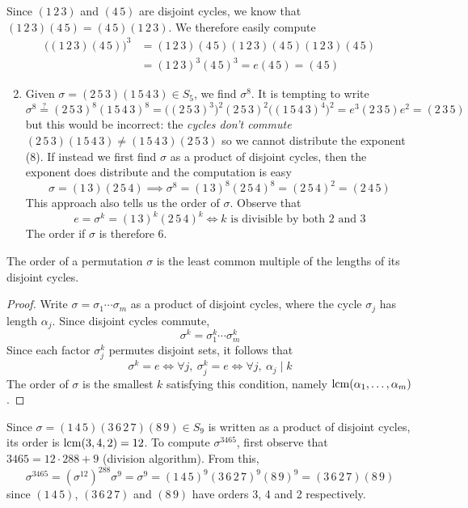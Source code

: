 \begin{examples}{}{}
	\exstart Since $(1\,2\,3)$ and $(4\,5)$ are disjoint cycles, we know that $(1\,2\,3)(4\,5)=(4\,5)(1\,2\,3)$. We therefore easily compute
		\begin{align*}
			\bigl((1\,2\,3)(4\,5)\bigr)^3&=(1\,2\,3)(4\,5)(1\,2\,3)(4\,5)(1\,2\,3)(4\,5)\\
			&=(1\,2\,3)^3(4\,5)^3 =e(4\,5)=(4\,5)
		\end{align*}
	\begin{enumerate}\setcounter{enumi}{1}
		\item Given $\sigma=(2\,5\,3)(1\,5\,4\,3)\in S_5$, we find $\sigma^{8}$. It is tempting to write
		\[
			\sigma^{8}\overset{\text{?}}{=}(2\,5\,3)^{8}(1\,5\,4\,3)^{8} =\bigl((2\,5\,3)^3\bigr)^2(2\,5\,3)^2\bigl((1\,5\,4\,3)^4\bigr)^2 =e^3(2\,3\,5)e^2  =(2\,3\,5)
		\]
		but this would be incorrect: the \emph{cycles don't commute} $(2\,5\,3)(1\,5\,4\,3)\neq (1\,5\,4\,3)(2\,5\,3)$ so we cannot distribute the exponent (8). If instead we first find $\sigma$ as a product of disjoint cycles, then the exponent does distribute and the computation is easy
		\[
			\sigma=(1\,3)(2\,5\,4)\implies \sigma^8=(1\,3)^8(2\,5\,4)^8=(2\,5\,4)^2 =(2\,4\,5)
		\]
		This approach also tells us the order of $\sigma$. Observe that
		\[
			e=\sigma^k=(1\,3)^k(2\,5\,4)^k\iff k\text{ is divisible by both 2 and 3}
		\]
		The order if $\sigma$ is therefore 6.
	\end{enumerate}
\end{examples}

\begin{cor}{}{}
	The order of a permutation $\sigma$ is the least common multiple of the lengths of its disjoint cycles.
\end{cor}

\begin{proof}
	Write $\sigma=\sigma_1\cdots\sigma_m$ as a product of disjoint cycles, where the cycle $\sigma_j$ has length $\alpha_j$. Since disjoint cycles commute,
	\[
		\sigma^k=\sigma_1^k\cdots\sigma_m^k
	\]
	Since each factor $\sigma_j^k$ permutes disjoint sets, it follows that
	\[
		\sigma^k=e\iff\forall j,\ \sigma_j^k=e \iff \forall j, \ \alpha_j\mid k \tag{the order of an $\alpha_j$-cycle is $\alpha_j$}
	\] 
	The order of $\sigma$ is the smallest $k$ satisfying this condition, namely $\operatorname{lcm}(\alpha_1,\ldots,\alpha_m)$.
\end{proof}

\begin{example}{}{}
	Since $\sigma=(1\,4\,5)(3\,6\,2\,7)(8\,9)\in S_9$ is written as a product of disjoint cycles, its order is $\operatorname{lcm}(3,4,2)=12$.\smallbreak
	To compute $\sigma^{3465}$, first observe that $3465=12\cdot 288+9$ (division algorithm). From this,
	\[
		\sigma^{3465}=(\sigma^{12})^{288}\sigma^9=\sigma^9=(1\,4\,5)^9(3\,6\,2\,7)^9(8\,9)^9=(3\,6\,2\,7)(8\,9)
	\]
	since $(1\,4\,5)$, $(3\,6\,2\,7)$ and $(8\,9)$ have orders 3, 4 and 2 respectively.
\end{example}

